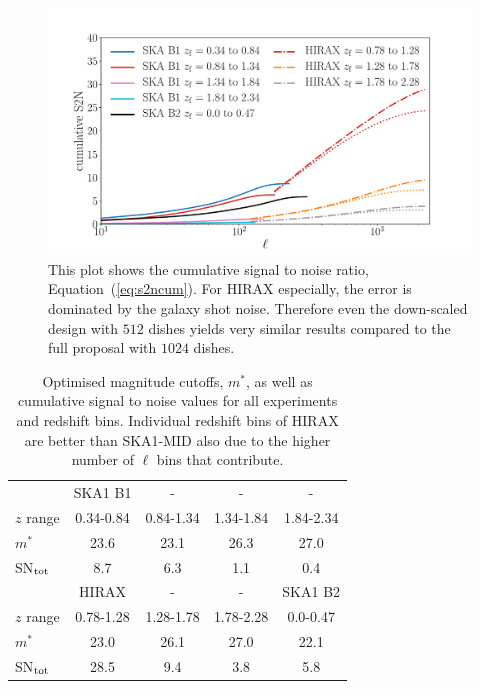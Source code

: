 \documentclass[useAMS,usenatbib]{mnras}
\begin{document}
\begin{figure}
\centering\includegraphics[width=.99\columnwidth]{S2N_SKA_HIRAX_CUM.pdf}
\captionsetup{width=.9\linewidth}

\caption{This plot shows the cumulative signal to noise ratio, Equation~(\ref{eq:s2ncum}). For HIRAX especially, the error is dominated by the galaxy shot noise. Therefore even the down-scaled design with $512$ dishes yields very similar results compared to the full proposal with $1024$ dishes.}
\label{fig:S2N_cum}
\end{figure}

\begin{table}
  \begin{center}
    \begin{tabular}{l|cccc}
      &SKA1 B1&-&-&- \\
      $z$ range & 0.34-0.84 & 0.84-1.34 & 1.34-1.84 & 1.84-2.34 \\
      $m^*$           &  23.6 &  23.1 & 26.3 &  27.0 \\
      SN$_{\rm tot}$       &  8.7 &  6.3 & 1.1 &  0.4 \\
      \hline
       & HIRAX  & - & - & SKA1 B2\\
     $z$ range  & 0.78-1.28 & 1.28-1.78 & 1.78-2.28 & 0.0-0.47\\
     $m^*$            &  23.0 & 26.1 &  27.0&  22.1 \\
     SN$_{\rm tot}$        &  28.5 & 9.4 &  3.8 &  5.8\\
    \end{tabular}
    \captionsetup{width=.9\linewidth}

    \caption{Optimised magnitude cutoffs, $m^*$, as well as cumulative signal to noise values for all experiments and redshift bins. Individual redshift bins of HIRAX are better than SKA1-MID also due to the higher number of $\ell$ bins that contribute. }
    \label{tab:res}
  \end{center}
\end{table}
\end{document}
